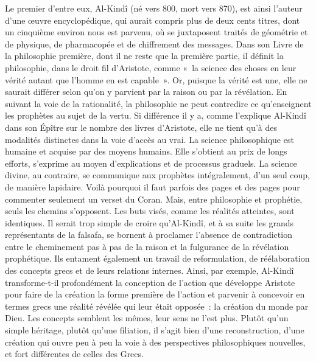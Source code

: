 Le premier d’entre eux, Al-Kindî (né vers 800, mort vers 870), est ainsi l’auteur d’une œuvre encyclopédique, qui aurait compris plus de deux cents titres, dont un cinquième environ nous est parvenu, où se juxtaposent traités de géométrie et de physique, de pharmacopée et de chiffrement des messages. Dans son Livre de la philosophie première, dont il ne reste que la première partie, il définit la philosophie, dans le droit fil d’Aristote, comme « la science des choses en leur vérité autant que
l’homme en est capable ». Or, puisque la vérité est une, elle ne saurait différer selon qu’on y parvient par la raison ou par la révélation. En suivant la voie de la rationalité, la philosophie ne peut contredire ce qu’enseignent les prophètes au sujet de la vertu. Si différence il y a, comme l’explique Al-Kindî dans son Épître sur le nombre des livres d’Aristote, elle ne tient qu’à des modalités distinctes dans la voie d’accès au vrai. La science philosophique est humaine et acquise par des moyens humains. Elle s’obtient au prix de longs efforts, s’exprime au moyen d’explications et de processus graduels. La science divine, au contraire, se communique aux prophètes intégralement, d’un seul coup, de manière lapidaire. Voilà pourquoi il faut parfois des pages et des pages pour commenter seulement un verset du Coran. Mais, entre philosophie et prophétie, seuls les chemins s’opposent. Les buts visés, comme les réalités atteintes, sont identiques. Il serait trop simple de croire qu’Al-Kindî, et à sa suite les grands représentants de la falsafa, se bornent à proclamer l’absence de contradiction
entre le cheminement pas à pas de la raison et la fulgurance de la révélation prophétique. Ils entament également un travail de reformulation, de réélaboration des concepts grecs et de leurs relations internes. Ainsi, par exemple, Al-Kindî transforme-t-il profondément la conception de l’action que développe Aristote pour faire de la création la forme première de l’action et parvenir à concevoir en termes grecs une réalité révélée qui leur était opposée : la création du monde par Dieu. Les concepts semblent les mêmes, leur sens ne l’est plus. Plutôt qu’un simple héritage, plutôt qu’une filiation, il s’agit bien d’une reconstruction, d’une création qui ouvre peu à peu la voie à des perspectives philosophiques nouvelles, et fort différentes de celles des Grecs.


